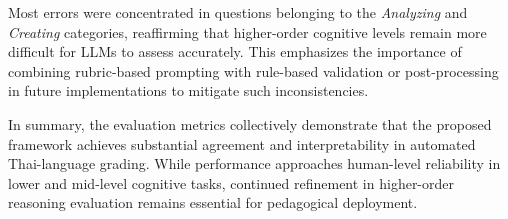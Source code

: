 Most errors were concentrated in questions belonging to the 
\textit{Analyzing} and \textit{Creating} categories, 
reaffirming that higher-order cognitive levels remain more 
difficult for LLMs to assess accurately. 
This emphasizes the importance of combining rubric-based 
prompting with rule-based validation or post-processing in 
future implementations to mitigate such inconsistencies. 

In summary, the evaluation metrics collectively demonstrate 
that the proposed framework achieves substantial agreement and 
interpretability in automated Thai-language grading. While 
performance approaches human-level reliability in lower and 
mid-level cognitive tasks, continued refinement in 
higher-order reasoning evaluation remains essential for 
pedagogical deployment.

